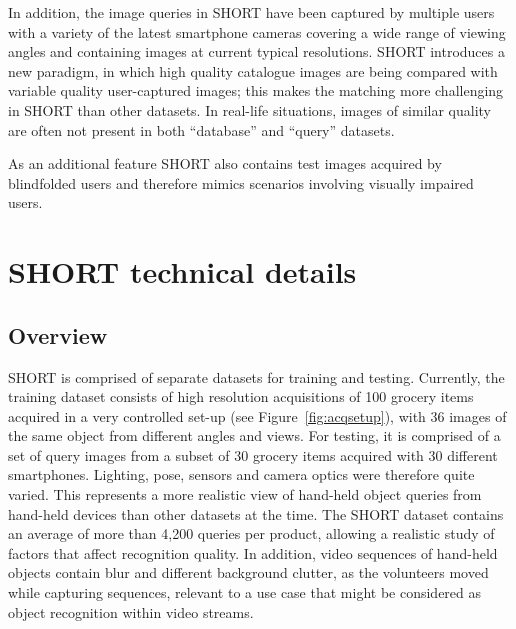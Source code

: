 In addition, the image queries in SHORT have been captured by multiple users with a variety of the latest smartphone cameras covering a wide range of viewing angles and containing images at current typical resolutions. SHORT introduces a new paradigm, in which high quality catalogue images are being compared with variable quality user-captured images; this makes the matching more challenging in SHORT than other datasets. In real-life situations, images of similar quality are often not present in both ``database'' and ``query'' datasets. 

As an additional feature SHORT also contains test images acquired by blindfolded users and therefore mimics scenarios involving visually impaired users. 


\section{SHORT technical details} \label{sec:short}

\subsection{Overview}

SHORT is comprised of separate datasets for training and testing. Currently, the training dataset consists of high resolution acquisitions of 100 grocery items acquired in a very controlled set-up (see Figure~\ref{fig:acqsetup}), with 36 images of the same object from different angles and views. For testing, it is comprised of a set of query images from a subset of 30 grocery items acquired with 30 different smartphones. Lighting, pose, sensors and camera optics were therefore quite varied. This represents a more realistic view of hand-held object queries from hand-held devices than other datasets at the time. The SHORT dataset contains an average of more than 4,200 queries per product, allowing a realistic study of factors that affect recognition quality. In addition, video sequences of hand-held objects contain blur and different background clutter, as the volunteers moved while capturing sequences, relevant to a use case that might be considered as object recognition within video streams. 


